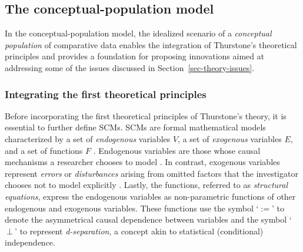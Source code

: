 \documentclass[
  authoryear,
  review,
  1p]{elsarticle}
\begin{document}
\subsection{The conceptual-population
model}\label{sec-theory-theoretical_P}

In the conceptual-population model, the idealized scenario of a
\emph{conceptual population} of comparative data enables the integration
of Thurstone's theoretical principles and provides a foundation for
proposing innovations aimed at addressing some of the issues discussed
in Section~\ref{sec-theory-issues}.

\subsubsection{Integrating the first theoretical
principles}\label{sec-theory-theoretical_P1}

Before incorporating the first theoretical principles of Thurstone's
theory, it is essential to further define SCMs. SCMs are formal
mathematical models characterized by a set of \emph{endogenous}
variables \(V\), a set of \emph{exogenous} variables \(E\), and a set of
functions \(F\)
\citep{Pearl_2009, Pearl_et_al_2016, Cinelli_et_al_2020}. Endogenous
variables are those whose causal mechanisms a researcher chooses to
model \citep{Neal_2020}. In contrast, exogenous variables represent
\emph{errors} or \emph{disturbances} arising from omitted factors that
the investigator chooses not to model explicitly \citep{Pearl_2009}.
Lastly, the functions, referred to as \emph{structural equations},
express the endogenous variables as non-parametric functions of other
endogenous and exogenous variables. These functions use the symbol
`\(:=\)' to denote the asymmetrical causal dependence between variables
and the symbol `\(\:\bot\:\)' to represent \emph{d-separation}, a
concept akin to statistical (conditional) independence.
\end{document}
